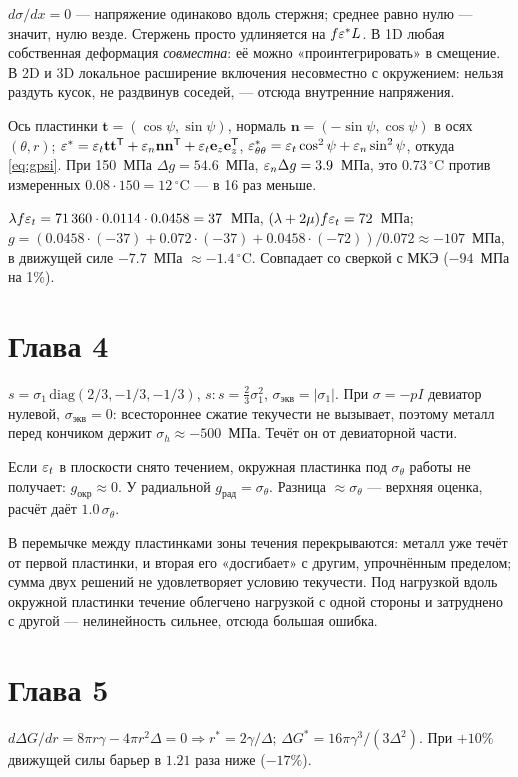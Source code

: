  $d\sigma/dx=0$ --- напряжение одинаково вдоль стержня; среднее равно нулю --- значит, нулю
везде. Стержень просто удлиняется на $f\varepsilon^*L$. В 1D любая собственная деформация
\emph{совместна}: её можно «проинтегрировать» в смещение. В 2D и 3D локальное расширение включения
несовместно с окружением: нельзя раздуть кусок, не раздвинув соседей, --- отсюда внутренние напряжения.

 Ось пластинки $\mathbf t=(\cos\psi,\sin\psi)$, нормаль $\mathbf n=(-\sin\psi,\cos\psi)$ в
осях $(\theta,r)$; $\varepsilon^*=\varepsilon_t\mathbf t\mathbf t^{\mathsf T}+\varepsilon_n\mathbf n\mathbf n^{\mathsf T}+\varepsilon_t\mathbf e_z\mathbf e_z^{\mathsf T}$,
$\varepsilon^*_{\theta\theta}=\varepsilon_t\cos^2\psi+\varepsilon_n\sin^2\psi$, откуда \eqref{eq:gpsi}. При 150~МПа
$\Delta g=54.6$~МПа, $\varepsilon_n\Delta g=3.9$~МПа, это $0.73\,^\circ$C против измеренных $0.08\cdot150=12\,^\circ$C ---
в 16 раз меньше.

 $\lambda f\varepsilon_t=71\,360\cdot0.0114\cdot0.0458=37$~МПа, $(\lambda+2\mu)f\varepsilon_t=72$~МПа;
$g=(0.0458\cdot(-37)+0.072\cdot(-37)+0.0458\cdot(-72))/0.072\approx-107$~МПа, в движущей силе
$-7.7$~МПа $\approx-1.4\,^\circ$C. Совпадает со сверкой с МКЭ ($-94$~МПа на 1\%).

\section*{Глава 4}
 $s=\sigma_1\,\mathrm{diag}(2/3,-1/3,-1/3)$, $s:s=\tfrac23\sigma_1^2$, $\sigma_{\text{экв}}=|\sigma_1|$.
При $\sigma=-pI$ девиатор нулевой, $\sigma_{\text{экв}}=0$: всестороннее сжатие текучести не вызывает,
поэтому металл перед кончиком держит $\sigma_h\approx-500$~МПа. Течёт он от девиаторной части.

 Если $\varepsilon_t$ в плоскости снято течением, окружная пластинка под $\sigma_\theta$ работы не
получает: $g_{\text{окр}}\approx0$. У радиальной $g_{\text{рад}}=\sigma_\theta$. Разница $\approx\sigma_\theta$ ---
верхняя оценка, расчёт даёт $1.0\,\sigma_\theta$.

 В перемычке между пластинками зоны течения перекрываются: металл уже течёт от первой
пластинки, и вторая его «досгибает» с другим, упрочнённым пределом; сумма двух решений не
удовлетворяет условию текучести. Под нагрузкой вдоль окружной пластинки течение облегчено
нагрузкой с одной стороны и затруднено с другой --- нелинейность сильнее, отсюда большая ошибка.

\section*{Глава 5}
 $d\Delta G/dr=8\pi r\gamma-4\pi r^2\Delta=0\Rightarrow r^*=2\gamma/\Delta$;
$\Delta G^*=16\pi\gamma^3/(3\Delta^2)$. При $+10\%$ движущей силы барьер в $1.21$ раза ниже ($-17\%$).


